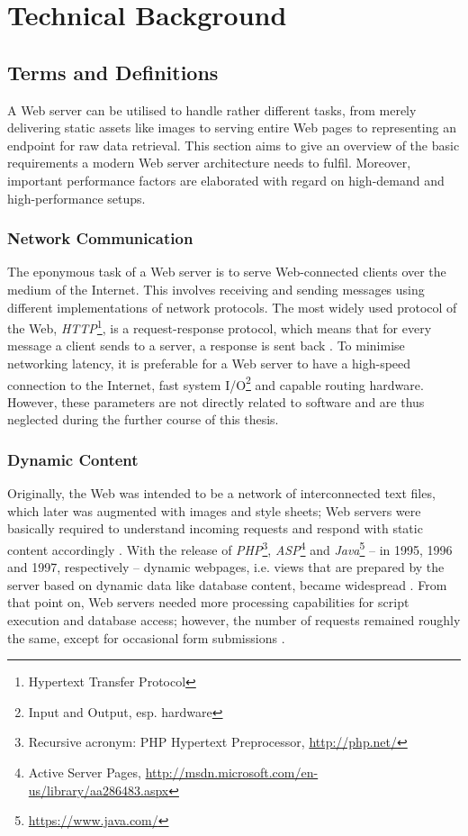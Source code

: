 \chapter{Technical Background}
\label{lab:technical}

\section{Terms and Definitions}
\label{sec:terms}

A Web server can be utilised to handle rather different tasks, from merely delivering static assets like images to serving entire Web pages to representing an endpoint for raw data retrieval. This section aims to give an overview of the basic requirements a modern Web server architecture needs to fulfil. Moreover, important performance factors are elaborated with regard on high-demand and high-performance setups.

\subsection{Network Communication}
The eponymous task of a Web server is to serve Web-connected clients over the medium of the Internet. This involves receiving and sending messages using different implementations of network protocols. The most widely used protocol of the Web, \textit{HTTP}\footnote{Hypertext Transfer Protocol}, is a request-response protocol, which means that for every message a client sends to a server, a response is sent back \cite{http}. To minimise networking latency, it is preferable for a Web server to have a high-speed connection to the Internet, fast system I/O\footnote{\label{lab:io}Input and Output, esp. hardware} and capable routing hardware. However, these parameters are not directly related to software and are thus neglected during the further course of this thesis.

\subsection{Dynamic Content}
Originally, the Web was intended to be a network of interconnected text files, which later was augmented with images and style sheets; Web servers were basically required to understand incoming requests and respond with static content accordingly \cite{http}. With the release of \textit{PHP}\footnote{Recursive acronym: PHP Hypertext Preprocessor, \url{http://php.net/}}, \textit{ASP}\footnote{Active Server Pages, \url{http://msdn.microsoft.com/en-us/library/aa286483.aspx}} and \textit{Java}\footnote{\url{https://www.java.com/}} -- in 1995, 1996 and 1997, respectively -- dynamic webpages, i.e. views that are prepared by the server based on dynamic data like database content, became widespread \cite{webhistory}. From that point on, Web servers needed more processing capabilities for script execution and database access; however, the number of requests remained roughly the same, except for occasional form submissions \cite{webhistory}.

